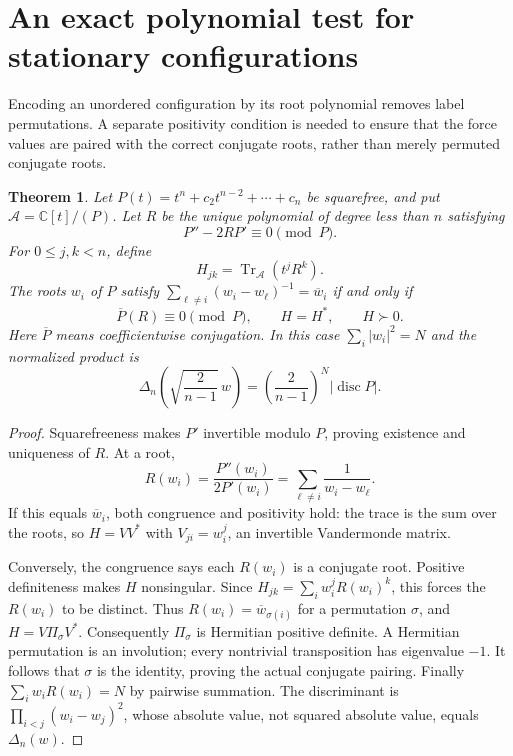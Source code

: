 \documentclass[11pt]{article}
\newtheorem{theorem}{Theorem}[section]
\theoremstyle{remark}
\newcommand{\C}{\mathbb C}
\numberwithin{equation}{section}
\begin{document}
\section{An exact polynomial test for stationary configurations}
\label{sec:trace-stationary}
Encoding an unordered configuration by its root polynomial removes
label permutations. A separate positivity condition is needed to
ensure that the force values are paired with the correct conjugate
roots, rather than merely permuted conjugate roots.

\begin{theorem}\label{thm:trace-stationary}
Let $P(t)=t^n+c_2t^{n-2}+\cdots+c_n$ be squarefree, and put
$\mathcal A=\C[t]/(P)$. Let $R$ be the unique polynomial of degree
less than $n$ satisfying
\begin{equation}\label{eq:force-modulo}
 P''-2RP'\equiv0\pmod P.
\end{equation}
For $0\le j,k<n$, define
\begin{equation}\label{eq:trace-matrix}
 H_{jk}=\operatorname{Tr}_{\mathcal A}(t^jR^k).
\end{equation}
The roots $w_i$ of $P$ satisfy
$\sum_{\ell\ne i}(w_i-w_\ell)^{-1}=\overline w_i$ if and only if
\begin{equation}\label{eq:trace-conditions}
 \overline P(R)\equiv0\pmod P,\qquad H=H^*,\qquad H\succ0.
\end{equation}
Here $\overline P$ means coefficientwise conjugation.
In this case $\sum_i|w_i|^2=N$ and the normalized product is
\begin{equation}\label{eq:disc-normalization}
 \Delta_n\!\left(\sqrt{\frac2{n-1}}\,w\right)
   =\left(\frac2{n-1}\right)^N|\operatorname{disc}P|.
\end{equation}
\end{theorem}
\begin{proof}
Squarefreeness makes $P'$ invertible modulo $P$, proving existence
and uniqueness of $R$. At a root,
\[
 R(w_i)=\frac{P''(w_i)}{2P'(w_i)}
       =\sum_{\ell\ne i}\frac1{w_i-w_\ell}.
\]
If this equals $\overline w_i$, both congruence and positivity hold:
the trace is the sum over the roots, so $H=VV^*$ with
$V_{ji}=w_i^j$, an invertible Vandermonde matrix.

Conversely, the congruence says each $R(w_i)$ is a conjugate root.
Positive definiteness makes $H$ nonsingular. Since
$H_{jk}=\sum_i w_i^jR(w_i)^k$, this forces the $R(w_i)$ to be distinct.
Thus $R(w_i)=\overline w_{\sigma(i)}$ for a permutation $\sigma$, and
$H=V\Pi_\sigma V^*$. Consequently $\Pi_\sigma$ is Hermitian positive
definite. A Hermitian permutation is an involution; every
nontrivial transposition has eigenvalue $-1$. It follows that
$\sigma$ is the identity, proving the actual conjugate pairing.
Finally $\sum_i w_iR(w_i)=N$ by pairwise summation.
The discriminant is $\prod_{i<j}(w_i-w_j)^2$, whose absolute value,
not squared absolute value, equals $\Delta_n(w)$.
\end{proof}
\end{document}
